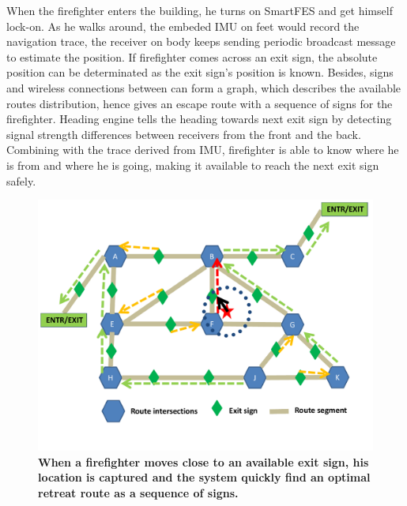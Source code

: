 \documentclass[conference]{IEEEtran}
\begin{document}
    When the firefighter enters the building, he turns on SmartFES and get himself lock-on. As he walks around, the embeded IMU on feet would record the navigation trace, the receiver on body keeps sending periodic broadcast message to estimate the position. If firefighter comes across an exit sign, the absolute position can be determinated as the exit sign's position is known. Besides, signs and wireless connections between can form a graph, which describes the available routes distribution, hence gives an escape route with a sequence of signs for the firefighter. Heading engine tells the heading towards next exit sign by detecting signal strength differences between receivers from the front and the back. Combining with the trace derived from IMU, firefighter is able to know where he is from and where he is going, making it available to reach the next exit sign safely.
      \begin{figure}[!t]
      \centering
      \includegraphics[width=1 \linewidth]{pic/usecaseE.pdf}
      \caption{\bf When a firefighter moves close to an available exit sign, his location is captured and the system quickly find an optimal retreat route as a sequence of signs.}
      \label{fig:usecase}
      \end{figure}

        
      
\end{document}
